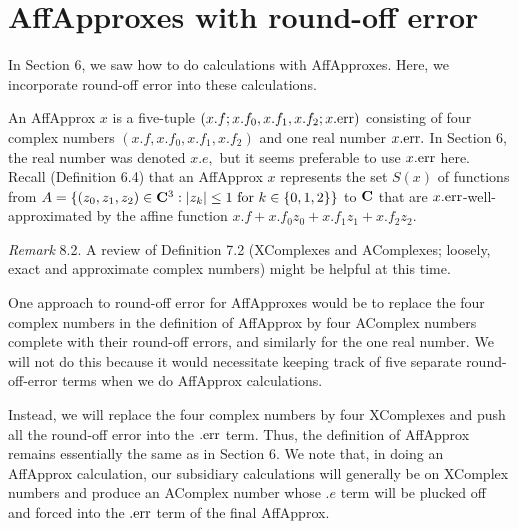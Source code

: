 \section{AffApproxes with round-off error}
 
In Section 6, we saw how to do calculations with AffApproxes.  Here, we incorporate round-off error into
these calculations.  

An AffApprox $x$ is a five-tuple
$(x.f; x.f_0,x.f_1,x.f_2; x.{\rm err})$
consisting of four complex numbers $(x.f, x.f_0,x.f_1, x.f_2)$ and one real number $x.{\rm err}.$  In Section 6, the
real number was denoted $x.e,$ but it seems preferable to use $x.{\rm err}$ here.  Recall (Definition 6.4)
that an AffApprox $x$ represents the set $S(x)$ of functions from $A = \{(z_0,z_1,z_2) \in {\bf C}^3 : |z_k| \le 1 \
{\rm for} \ k \in \{0,1,2\}\}$ to ${\bf C}$ that are $x.{\rm err}$-well-approximated by the affine function
$x.f + x.f_0 z_0 + x.f_1 z_1 + x.f_2 z_2.$
\enddemo

{\it Remark} 8.2.
A review of Definition 7.2 (XComplexes and AComplexes; loosely, exact and approximate complex numbers) might be helpful at this time.

One approach to round-off error for AffApproxes would be to replace the four complex numbers in the definition of AffApprox by four AComplex numbers complete with their round-off errors, and similarly for the one real number.  We will not do this because it would necessitate keeping track of five separate round-off-error terms when we do AffApprox calculations.

Instead, we will 
replace the four complex numbers by four XComplexes and push all the round-off error into the $.{\rm err}$ term.  
Thus, the definition of AffApprox remains 
essentially the same as in Section 6.
We note that, in doing an AffApprox calculation, our subsidiary calculations will generally be on XComplex numbers and produce an AComplex number whose $.e$ term will be plucked off and forced into the $.{\rm err}$ term of the final AffApprox.


